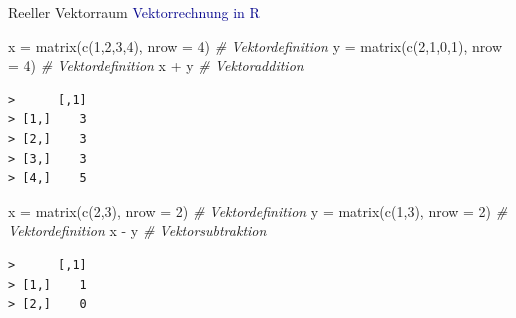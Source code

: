 \documentclass[
  8pt,
  ignorenonframetext,
]{beamer}
\newenvironment{Shaded}{\begin{snugshade}}{\end{snugshade}}
\newcommand{\AttributeTok}[1]{\textcolor[rgb]{0.77,0.63,0.00}{#1}}
\newcommand{\CommentTok}[1]{\textcolor[rgb]{0.56,0.35,0.01}{\textit{#1}}}
\newcommand{\DecValTok}[1]{\textcolor[rgb]{0.00,0.00,0.81}{#1}}
\newcommand{\FunctionTok}[1]{\textcolor[rgb]{0.00,0.00,0.00}{#1}}
\newcommand{\NormalTok}[1]{#1}
\newcommand{\OtherTok}[1]{\textcolor[rgb]{0.56,0.35,0.01}{#1}}
\newcommand{\SpecialCharTok}[1]{\textcolor[rgb]{0.00,0.00,0.00}{#1}}
\begin{document}
\begin{frame}[fragile]{Reeller Vektorraum}
\protect\hypertarget{reeller-vektorraum-4}{}
\textcolor{darkblue}{Vektorrechnung in R} \vspace{1mm} 
\footnotesize

\begin{Shaded}
\begin{Highlighting}[]
\NormalTok{x }\OtherTok{=} \FunctionTok{matrix}\NormalTok{(}\FunctionTok{c}\NormalTok{(}\DecValTok{1}\NormalTok{,}\DecValTok{2}\NormalTok{,}\DecValTok{3}\NormalTok{,}\DecValTok{4}\NormalTok{), }\AttributeTok{nrow =} \DecValTok{4}\NormalTok{)      }\CommentTok{\# Vektordefinition}
\NormalTok{y }\OtherTok{=} \FunctionTok{matrix}\NormalTok{(}\FunctionTok{c}\NormalTok{(}\DecValTok{2}\NormalTok{,}\DecValTok{1}\NormalTok{,}\DecValTok{0}\NormalTok{,}\DecValTok{1}\NormalTok{), }\AttributeTok{nrow =} \DecValTok{4}\NormalTok{)      }\CommentTok{\# Vektordefinition}
\NormalTok{x }\SpecialCharTok{+}\NormalTok{ y                                 }\CommentTok{\# Vektoraddition}
\end{Highlighting}
\end{Shaded}

\begin{verbatim}
>      [,1]
> [1,]    3
> [2,]    3
> [3,]    3
> [4,]    5
\end{verbatim}

\vspace{1mm}

\begin{Shaded}
\begin{Highlighting}[]
\NormalTok{x }\OtherTok{=} \FunctionTok{matrix}\NormalTok{(}\FunctionTok{c}\NormalTok{(}\DecValTok{2}\NormalTok{,}\DecValTok{3}\NormalTok{), }\AttributeTok{nrow =} \DecValTok{2}\NormalTok{)         }\CommentTok{\# Vektordefinition}
\NormalTok{y }\OtherTok{=} \FunctionTok{matrix}\NormalTok{(}\FunctionTok{c}\NormalTok{(}\DecValTok{1}\NormalTok{,}\DecValTok{3}\NormalTok{), }\AttributeTok{nrow =} \DecValTok{2}\NormalTok{)         }\CommentTok{\# Vektordefinition}
\NormalTok{x }\SpecialCharTok{{-}}\NormalTok{ y                                }\CommentTok{\# Vektorsubtraktion}
\end{Highlighting}
\end{Shaded}

\begin{verbatim}
>      [,1]
> [1,]    1
> [2,]    0
\end{verbatim}

\vspace{1mm}


\end{frame}
\end{document}
